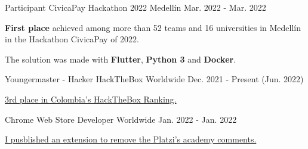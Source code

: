 
\begin{cventries}

  \cventry
    {Participant} %
    {CivicaPay Hackathon 2022} %
    {Medellín} %
    {Mar. 2022 - Mar. 2022} %
    {
      \begin{cvitems} %
        \item {\textbf{First place} achieved among more than 52 teams and 16 universities in 
        Medellín in the Hackathon CivicaPay of 2022.}
        \item {The solution was made with \textbf{Flutter}, \textbf{Python 3} and \textbf{Docker}.}
      \end{cvitems}
    }

  \cventry
    {Youngermaster - Hacker} %
    {HackTheBox} %
    {Worldwide} %
    {Dec. 2021 - Present (Jun. 2022)} %
    {
      \begin{cvitems} %
        \item {\href{https://app.hackthebox.com/profile/643960}{3rd place in Colombia's HackTheBox Ranking.}}
      \end{cvitems}
    }

  \cventry
    {Chrome Web Store} %
    {Developer} %
    {Worldwide} %
    {Jan. 2022 - Jan. 2022} %
    {
      \begin{cvitems} %
        \item {\href{https://chrome.google.com/webstore/detail/platzi-community-wrapper/dakgbbfpefoofghfbkopnbnpadeblbep}
        {I pusblished an extension to remove the Platzi's academy comments.}}
      \end{cvitems}
    }



\end{cventries}
